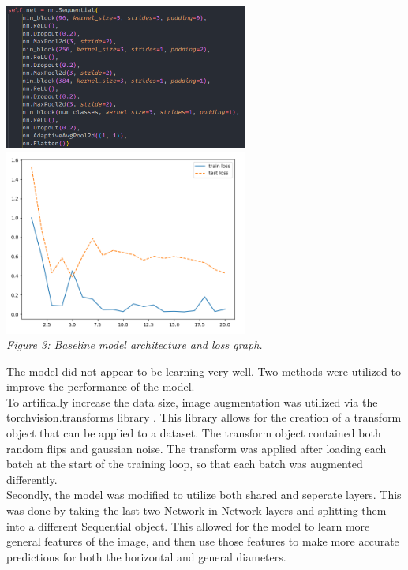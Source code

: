 \documentclass{article}[12pt]
\begin{document}
\begin{center}
    \includegraphics[width=0.6\textwidth]{images/baseline_model.png}\\
    \includegraphics[width=0.6\textwidth]{images/baseline_model_graph.png}\\
    \textit{Figure 3: Baseline model architecture and loss graph.}
\end{center}

The model did not appear to be learning very well. Two methods were utilized to improve the performance of the model.\\
\indent
To artifically increase the data size, image augmentation was utilized via the torchvision.transforms library \cite{transforms}. This library allows for the creation of a transform object that can be applied to a dataset. The transform object contained both random flips and gaussian noise. The transform was applied after loading each batch at the start of the training loop, so that each batch was augmented differently.\\
\indent
Secondly, the model was modified to utilize both shared and seperate layers. This was done by taking the last two Network in Network layers and splitting them into a different Sequential object. This allowed for the model to learn more general features of the image, and then use those features to make more accurate predictions for both the horizontal and general diameters.\\
\end{document}
